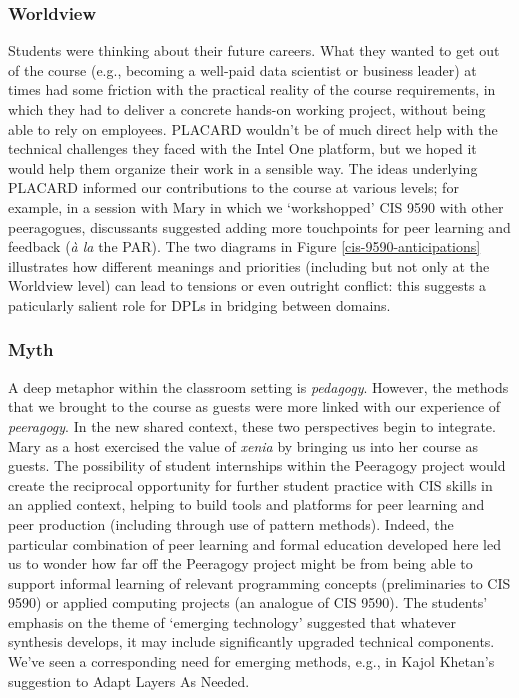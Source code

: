 \documentclass[acmlarge,timestamp]{acmart}
\begin{document}
\subsubsection{Worldview}
Students were thinking about their future careers.  What they wanted
to get out of the course (e.g., becoming a well-paid data scientist or
business leader) at times had some friction with the practical reality
of the course requirements, in which they had to deliver a concrete
hands-on working project, without being able to rely on employees.
PLACARD wouldn’t be of much direct help with the technical challenges
they faced with the Intel One platform, but we hoped it would help
them organize their work in a sensible way.  The ideas underlying
PLACARD informed our contributions to the course at various levels;
for example, in a session with Mary in which we ‘workshopped’ CIS 9590
with other peeragogues, discussants suggested adding more touchpoints
for peer learning and feedback (\emph{\`a la} the PAR).  The two
diagrams in Figure \ref{cis-9590-anticipations} illustrates how
different meanings and priorities (including but not only at the
Worldview level) can lead to tensions or even outright conflict: this
suggests a paticularly salient role for DPLs in bridging between
domains.

\subsubsection{Myth}
A deep metaphor within the classroom setting is \emph{pedagogy}.
However, the methods that we brought to the course as guests were more
linked with our experience of \emph{peeragogy}.  In the new shared
context, these two perspectives begin to integrate.  Mary as a host
exercised the value of \emph{xenia} by bringing us into her course as
guests.  The possibility of student internships within the Peeragogy
project would create the reciprocal opportunity for further student
practice with CIS skills in an applied context, helping to build tools
and platforms for peer learning and peer production (including through
use of pattern methods).  Indeed, the particular combination of peer
learning and formal education developed here led us to wonder how far
off the Peeragogy project might be from being able to support informal
learning of relevant programming concepts (preliminaries to CIS 9590)
or applied computing projects (an analogue of CIS 9590).  The
students’ emphasis on the theme of ‘emerging technology’ suggested
that whatever synthesis develops, it may include significantly
upgraded technical components.  We’ve seen a corresponding need for
emerging methods, e.g., in Kajol Khetan’s suggestion to {\sc Adapt
  Layers As Needed}.
\end{document}
